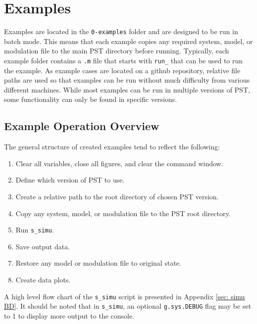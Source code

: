 \chapter{Examples}
Examples are located in the \verb|0-examples| folder and are designed to be run in batch mode.
This means that each example copies any required system, model, or modulation file to the main PST directory before running.
Typically, each example folder contains a \verb|.m| file that starts with \verb|run_| that can be used to run the example.
As example cases are located on a github repository, relative file paths are used so that examples can be run without much difficulty from various different machines.
While most examples can be run in multiple versions of PST, some functionality can only be found in specific versions.


\section{Example Operation Overview }

\noindent The general structure of created examples tend to reflect the following:
\begin{enumerate}
\itemsep 0em
\item Clear all variables, close all figures, and clear the command window.
\item Define which version of PST to use.
\item Create a relative path to the root directory of chosen PST version.
\item Copy any system, model, or modulation file to the PST root directory.
\item Run \verb|s_simu|.
\item Save output data.
\item Restore any model or modulation file to original state.
\item Create data plots.
\end{enumerate}

A high level flow chart of the \verb|s_simu| script is presented in Appendix \ref{sec: simu BD}.
It should be noted that in \verb|s_simu|, an optional \verb|g.sys.DEBUG| flag may be set to 1 to display more output to the console.



